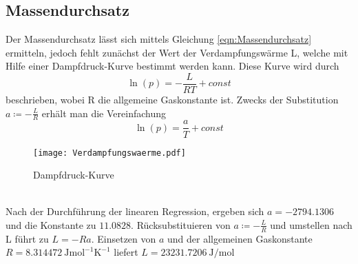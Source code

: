 \subsection{Massendurchsatz}
Der Massendurchsatz lässt sich mittels Gleichung \eqref{eqn:Massendurchsatz} ermitteln, jedoch fehlt zunächst der Wert der Verdampfungswärme L, welche 
mit Hilfe einer Dampfdruck-Kurve bestimmt werden kann. Diese Kurve wird durch 
\begin{equation}
  \ln (p) = -\frac{L}{RT} + const 
\end{equation}
beschrieben, wobei R die allgemeine Gaskonstante ist. Zwecks der Substitution $a \coloneq -\frac{L}{R}$ erhält man die Vereinfachung
\begin{equation}
  \ln (p) = \frac{a}{T} + const
\end{equation}
\begin{figure}
  \centering
  \texttt{[image: Verdampfungswaerme.pdf]}
  \caption{Dampfdruck-Kurve}
  \label{fig:Dampfdruck}
\end{figure}\\
Nach der Durchführung der linearen Regression, ergeben sich $a = -2794.1306$ und die Konstante zu $11.0828$.
Rücksubstituieren von $a \coloneq -\frac{L}{R}$ und umstellen nach L führt zu $ L = - Ra$. Einsetzen von $a$ und der allgemeinen Gaskonstante 
$R = \SI{8.314472}{\joule\mole\tothe{-1}\kelvin\tothe{-1}}$ liefert $L = \SI{23231.7206}{\joule\per\mol}$